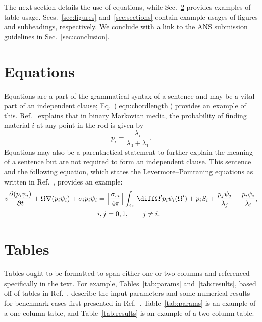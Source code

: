 \documentclass{nseJournal}
\begin{document}
The next section details the use of equations, while Sec.~\ref{sec:tables} provides examples of table usage.
Secs.~\ref{sec:figures} and~\ref{sec:sections} contain example usages of figures and subheadings, respectively.
We conclude with a link to the ANS submission guidelines in Sec.~\ref{sec:conclusion}.



\section{Equations}
\label{sec:equations}

Equations are a part of the grammatical syntax of a sentence and may be a vital part of an independent clause; Eq.~(\ref{eqn:chordlength}) provides an example of this.
Ref.~\cite{AdamsJQSRT1989} explains that in binary Markovian media, the probability of finding material \(i\) at any point in the rod is given by
\begin{equation}
  p_i = \frac{\lambda_i}{\lambda_0 + \lambda_1}.
  \label{eqn:chordlength}
\end{equation}
Equations may also be a parenthetical statement to further explain the meaning of a sentence but are not required to form an independent clause.
This sentence and the following equation, which states the Levermore--Pomraning equations as written in Ref.~\cite{AdamsJQSRT1989}, provides an example:
\begin{align}
\begin{split}
  v \frac{\partial(p_i \psi_i)}{\partial t} + \Omega \nabla(p_i \psi_i) + \sigma_i p_i \psi_i &= \left[ \frac{\sigma_{si}}{4\pi} \right] \int_{4\pi} \diff \Omega' p_i \psi_i(\Omega') + p_i S_i + \frac{p_j \psi_j}{\lambda_j} - \frac{p_i \psi_i}{\lambda_i}, \\ 
  & i, j = 0,1, \qquad j \neq i.
\end{split}
  \label{eqn:LPequations}
\end{align}



\section{Tables}
\label{sec:tables}

Tables ought to be formatted to span either one or two columns and referenced specifically in the text.
For example, Tables~\ref{tab:params} and~\ref{tab:results}, based off of tables in Ref.~\cite{BrantleyMC2009Incident}, describe the input parameters and some numerical results for benchmark cases first presented in Ref.~\cite{AdamsJQSRT1989}.
Table~\ref{tab:params} is an example of a one-column table, and Table~\ref{tab:results} is an example of a two-column table.
\end{document}
